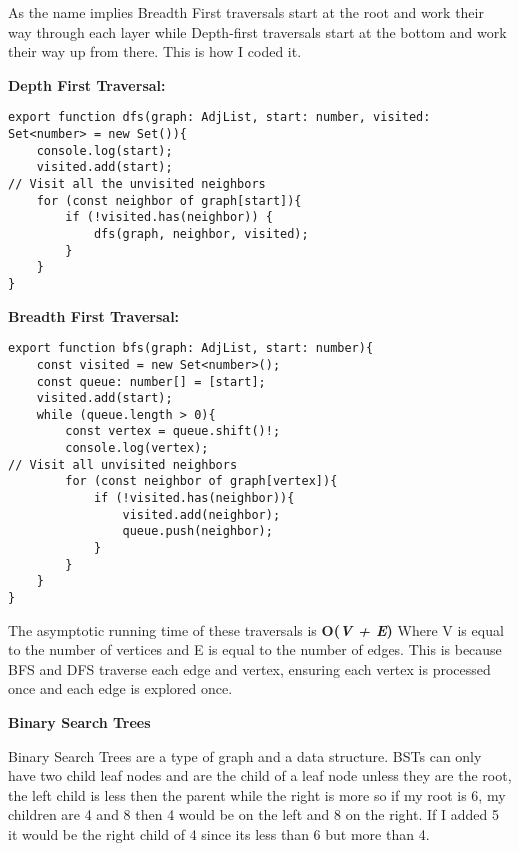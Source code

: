 \documentclass[12pt,letterpaper, onecolumn]{exam}
\begin{document}
\vspace{.2cm}

\centering As the name implies Breadth First traversals start at the root and work their way through each layer while Depth-first traversals start at the bottom and work their way up from there. This is how I coded it. 

\vspace{.4cm}


\begin{minipage}{0.45\textwidth}
  \centering\textbf{Depth First Traversal:}
  \begin{lstlisting}
export function dfs(graph: AdjList, start: number, visited: Set<number> = new Set()){
    console.log(start); 
    visited.add(start);
// Visit all the unvisited neighbors
    for (const neighbor of graph[start]){
        if (!visited.has(neighbor)) {
            dfs(graph, neighbor, visited);
        }
    }
}
  \end{lstlisting}
\end{minipage}
\hfill
\begin{minipage}{0.45\textwidth}
  \centering\textbf{Breadth First Traversal:}
  \begin{lstlisting}
export function bfs(graph: AdjList, start: number){
    const visited = new Set<number>();
    const queue: number[] = [start];
    visited.add(start);
    while (queue.length > 0){
        const vertex = queue.shift()!;
        console.log(vertex); 
// Visit all unvisited neighbors
        for (const neighbor of graph[vertex]){
            if (!visited.has(neighbor)){
                visited.add(neighbor);
                queue.push(neighbor);
            }
        }
    }
}
  \end{lstlisting}
\end{minipage}

\vspace{.5cm}

\centering The asymptotic running time of these traversals is \textbf{O(\textit{V + E})} Where V is equal to the number of vertices and E is equal to the number of edges. This is because BFS and DFS traverse each edge and vertex, ensuring each vertex is processed once and each edge is explored once.

\newpage

\centering\textbf{Binary Search Trees}

\vspace{.1cm}

\centering Binary Search Trees are a type of graph and a data structure. BSTs can only have two child leaf nodes and are the child of a leaf node unless they are the root, the left child is less then the parent while the right is more so if my root is 6, my children are 4 and 8 then 4 would be on the left and 8 on the right. If I added 5 it would be the right child of 4 since its less than 6 but more than 4. 
\end{document}
